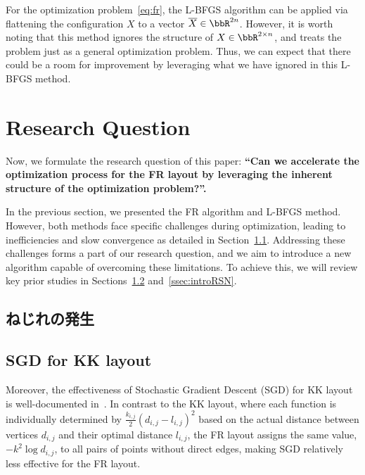 \documentclass[dvipdfmx,journal]{IEEEtran}
\begin{document}
For the optimization problem~\eqref{eq:fr}, the L-BFGS algorithm can be applied via flattening the configuration $X$ to a vector $\overline{X} \in \bbR^{2n}$.
However, it is worth noting that this method ignores the structure of $X \in \bbR^{2 \times n}$, and treats the problem just as a general optimization problem. Thus, we can expect that there could be a room for improvement by leveraging what we have ignored in this L-BFGS method.

\section{Research Question}\label{sec:RQ}

Now, we formulate the research question of this paper: \textbf{``Can we accelerate the optimization process for the FR layout by leveraging the inherent structure of the optimization problem?''.}

In the previous section, we presented the FR algorithm and L-BFGS method.
However, both methods face specific challenges during optimization, leading to inefficiencies and slow convergence as detailed in Section~\ref{ssec:twist}.
Addressing these challenges forms a part of our research question, and we aim to introduce a new algorithm capable of overcoming these limitations. To achieve this, we will review key prior studies in Sections~\ref{ssec:sgd} and~\ref{ssec:introRSN}.

\subsection{ねじれの発生}\label{ssec:twist}


\subsection{SGD for KK layout}\label{ssec:sgd}

Moreover, the effectiveness of Stochastic Gradient Descent (SGD) for KK layout is well-documented in~\cite{8419285}.
In contrast to the KK layout, where each function is individually determined by $\frac{k_{i,j}}{2}(d_{i,j}-l_{i,j})^2$ based on the actual distance between vertices $d_{i,j}$ and their optimal distance $l_{i,j}$, the FR layout assigns the same value, $-k^2\log{d_{i,j}}$, to all pairs of points without direct edges, making SGD relatively less effective for the FR layout.
\end{document}
